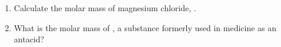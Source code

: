\documentclass[main.tex]{subfiles}
\begin{document}
\begin{fullwidth}
\begin{multicols*}{2}
\begin{enumerate}


\item Calculate the molar mass of magnesium chloride, .
 \begin{enumerate}[label=(\alph*)]\vspace{-0.5cm}
\end{enumerate}\vspace{-0.5cm}

\item What is the molar mass of , a substance formerly used in medicine as an antacid?
 \begin{enumerate}[label=(\alph*)]\vspace{-0.5cm}
\end{enumerate}\vspace{-0.5cm}


\end{enumerate}
\end{multicols*}
\end{fullwidth}
\end{document}
